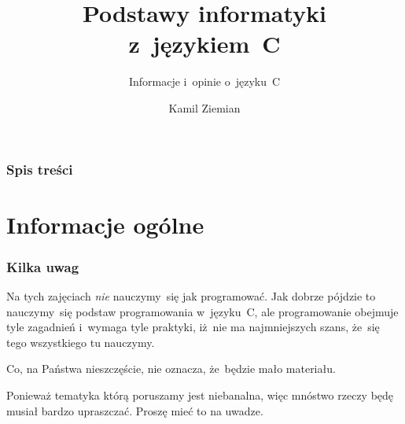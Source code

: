 \documentclass[10pt,t]{beamer}
\title{Podstawy informatyki z~językiem~C}
\subtitle{Informacje i~opinie o~języku~C}
\author{Kamil Ziemian}
\begin{document}





\RaggedRight





\maketitle





\begin{frame}
  \frametitle{Spis treści}


  \tableofcontents

\end{frame}





\section{Informacje ogólne}








\begin{frame}
  \frametitle{Kilka uwag}


  Na tych zajęciach \textit{nie} nauczymy~się jak programować. Jak dobrze
  pójdzie to nauczymy~się podstaw programowania w~języku~C, ale
  programowanie obejmuje tyle zagadnień i~wymaga tyle praktyki, iż~nie
  ma najmniejszych szans, że~się tego wszystkiego tu nauczymy.

  Co, na Państwa nieszczęście, nie oznacza, że~będzie mało materiału.

  Ponieważ tematyka którą poruszamy jest niebanalna, więc mnóstwo rzeczy
  będę musiał bardzo upraszczać. Proszę mieć to na uwadze.

\end{frame}
\end{document}
